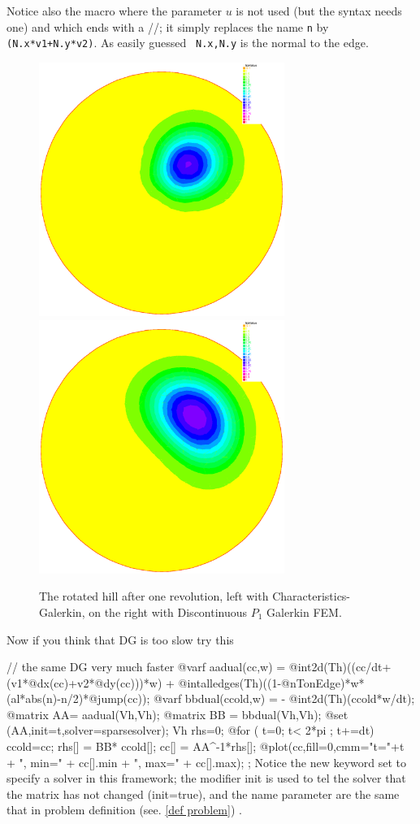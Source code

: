 \documentclass[a4paper,twoside,12pt]{book}
\def\x#1{#1\index{#1}}%
\begin{document}
Notice also the  \x{macro} where the parameter $u$ is not used (but
the syntax needs one) and which ends with a //; it simply replaces
the name {\tt n} by {\tt (N.x*v1+N.y*v2)}. As easily guessed {\tt
N.x,N.y} is the \x{normal} to the edge.

\begin{figure}[htbp]
\begin{center}
\includegraphics[width=8cm]{convectCG}
\includegraphics[width=8cm]{convectDG}

\caption{\label{figconvect} The rotated hill after one revolution, left with Characteristics-Galerkin,
on the right with Discontinuous $P_1$ Galerkin FEM.}
\end{center}
\end{figure}

Now if you think that DG is too slow try this
\bFF

// the same DG very much faster
@varf aadual(cc,w) = @int2d(Th)((cc/dt+(v1*@dx(cc)+v2*@dy(cc)))*w)
        + @intalledges(Th)((1-@nTonEdge)*w*(al*abs(n)-n/2)*@jump(cc));
@varf bbdual(ccold,w) =  - @int2d(Th)(ccold*w/dt);
@matrix  AA= aadual(Vh,Vh);
@matrix BB = bbdual(Vh,Vh);
@set (AA,init=t,solver=sparsesolver);
Vh rhs=0;
@for ( t=0; t< 2*pi ; t+=dt)
{
  ccold=cc;
  rhs[] = BB* ccold[];
  cc[] = AA^-1*rhs[];
  @plot(cc,fill=0,cmm="t="+t + ", min=" + cc[].min + ", max=" +  cc[].max);
};
\eFF
Notice the new keyword \x{set} to specify a solver in this framework; the modifier \x{init} is used
to tel the solver that the matrix has not changed (init=true), and the name parameter are the
same that in problem definition (see. \ref{def problem}) .
\end{document}
